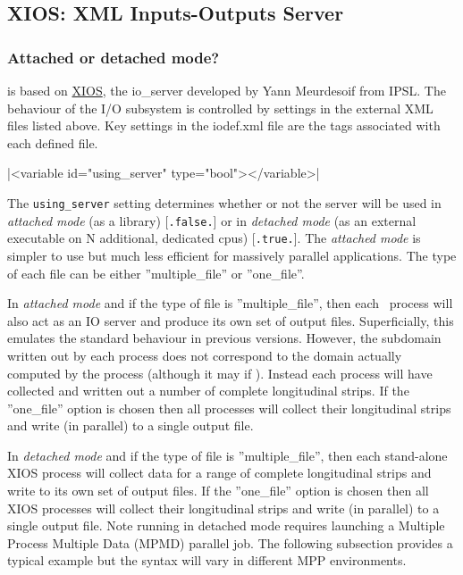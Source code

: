 \documentclass[../main/NEMO_manual]{subfiles}
\begin{document}
\subsection{XIOS: XML Inputs-Outputs Server}

\subsubsection{Attached or detached mode?}

 is based on \href{http://forge.ipsl.jussieu.fr/ioserver/wiki}{XIOS},
the io\_server developed by Yann Meurdesoif from IPSL.
The behaviour of the I/O subsystem is controlled by settings in the external XML files listed above.
Key settings in the iodef.xml file are the tags associated with each defined file.

\xmlline|<variable id="using_server" type="bool"></variable>|

The \texttt{using\_server} setting determines whether or not the server will be used in
\textit{attached mode}
(as a library) [\texttt{.false.}] or in \textit{detached mode}
(as an external executable on N additional, dedicated cpus) [\texttt{.true.}].
The \textit{attached mode} is simpler to use but much less efficient for
massively parallel applications.
The type of each file can be either ''multiple\_file'' or ''one\_file''.

In \textit{attached mode} and if the type of file is ''multiple\_file'',
then each \NEMO\ process will also act as an IO server and produce its own set of output files.
Superficially, this emulates the standard behaviour in previous versions.
However, the subdomain written out by each process does not correspond to
the  domain actually computed by the process (although it may if ).
Instead each process will have collected and written out a number of complete longitudinal strips.
If the ''one\_file'' option is chosen then all processes will collect their longitudinal strips and
write (in parallel) to a single output file.

In \textit{detached mode} and if the type of file is ''multiple\_file'',
then each stand-alone XIOS process will collect data for a range of complete longitudinal strips and
write to its own set of output files.
If the ''one\_file'' option is chosen then all XIOS processes will collect their longitudinal strips and
write (in parallel) to a single output file.
Note running in detached mode requires launching a Multiple Process Multiple Data (MPMD) parallel job.
The following subsection provides a typical example but the syntax will vary in different MPP environments.
\end{document}
